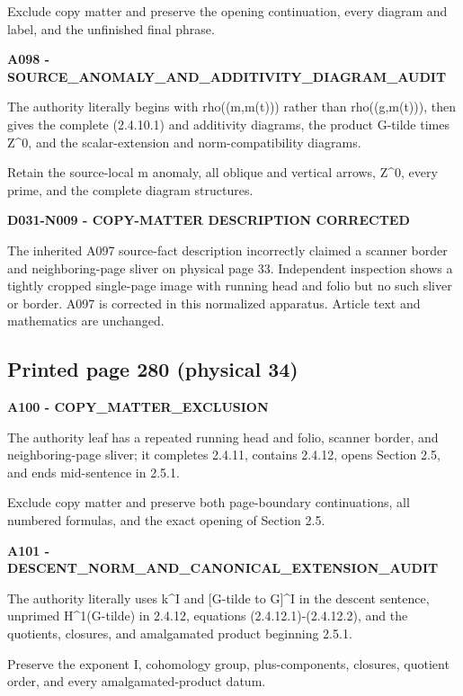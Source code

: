 \documentclass[10pt,a4paper]{article}
\begin{document}
Exclude copy matter and preserve the opening continuation, every diagram and label, and the unfinished final phrase.

\textbf{A098 - SOURCE\_ANOMALY\_AND\_ADDITIVITY\_DIAGRAM\_AUDIT}

The authority literally begins with rho((m,m(t))) rather than rho((g,m(t))), then gives the complete (2.4.10.1) and additivity diagrams, the product G-tilde times Z\^{}0, and the scalar-extension and norm-compatibility diagrams.

Retain the source-local m anomaly, all oblique and vertical arrows, Z\^{}0, every prime, and the complete diagram structures.

\textbf{D031-N009 - COPY-MATTER DESCRIPTION CORRECTED}

The inherited A097 source-fact description incorrectly claimed a scanner border and neighboring-page sliver on physical page 33. Independent inspection shows a tightly cropped single-page image with running head and folio but no such sliver or border. A097 is corrected in this normalized apparatus. Article text and mathematics are unchanged.

\subsection{Printed page 280 (physical 34)}

\textbf{A100 - COPY\_MATTER\_EXCLUSION}

The authority leaf has a repeated running head and folio, scanner border, and neighboring-page sliver; it completes 2.4.11, contains 2.4.12, opens Section 2.5, and ends mid-sentence in 2.5.1.

Exclude copy matter and preserve both page-boundary continuations, all numbered formulas, and the exact opening of Section 2.5.

\textbf{A101 - DESCENT\_NORM\_AND\_CANONICAL\_EXTENSION\_AUDIT}

The authority literally uses k\^{}I and {[}G-tilde to G{]}\^{}I in the descent sentence, unprimed H\^{}1(G-tilde) in 2.4.12, equations (2.4.12.1)-(2.4.12.2), and the quotients, closures, and amalgamated product beginning 2.5.1.

Preserve the exponent I, cohomology group, plus-components, closures, quotient order, and every amalgamated-product datum.

\end{document}
